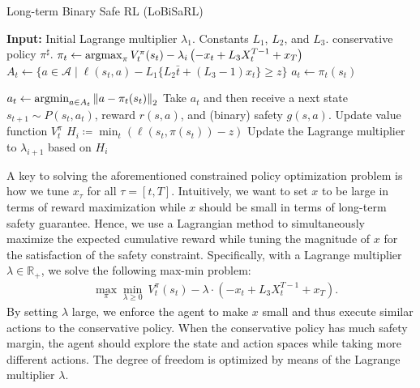 \documentclass[letterpaper]{article} %
\newcommand{\argmin}{\mathop{\rm argmin}}
\newcommand{\argmax}{\mathop{\rm argmax}}
\newcommand{\R}{\mathbb{R}}
\newcommand{\cA}{\mathcal{A}}
\newcommand{\norm}[1]{\left\|{#1}\right\|_2}
\newcommand{\algo}{\textsf{LoBiSaRL}}
\begin{document}
\begin{algorithm}[t]
    \caption{Long-term Binary Safe RL (\algo)}
    \label{alg:algorithm}
    \begin{algorithmic}[1]
    \begin{small}
        \STATE \textbf{Input:} Initial Lagrange multiplier $\lambda_1$. Constants $L_1$, $L_2$, and $L_3$. conservative policy $\pi^\sharp$.
                \STATE $\pi_t \leftarrow \argmax_\pi V_t^\pi(s_t) - \lambda_i \left(-x_t + L_3 X_{t}^{T-1} + x_{T}\right)$
                \STATE $A_t \leftarrow \{a \in \!\cA \mid \ell(s_t, a) - L_1 \{L_2 \bar{t} + (L_3 -1) x_t \} \ge z \}$
                    \STATE $a_t \leftarrow \pi_t(s_t)$
                \ELSE

                    \STATE $a_t \leftarrow \argmin_{a \in A_t} \norm{a - \pi_t(s_t)}$
                \ENDIF
                \STATE Take $a_t$ and then receive a next state $s_{t+1} \sim P(s_t, a_t)$, reward $r(s,a)$, and (binary) safety $g(s,a)$.
                \STATE Update value function $V_t^\pi$
            \ENDFOR
            \STATE $H_i \coloneqq \min_t \left(\ell(s_t, \pi(s_t)) - z \right)$
            \STATE Update the Lagrange multiplier to $\lambda_{i+1}$ based on $H_i$
        \ENDFOR
    \end{small}
    \end{algorithmic}
\end{algorithm}

A key to solving the aforementioned constrained policy optimization problem is how we tune $x_\tau$ for all $\tau = [t, T]$.
Intuitively, we want to set $x$ to be large in terms of reward maximization while $x$ should be small in terms of long-term safety guarantee.
Hence, we use a Lagrangian method to simultaneously maximize the expected cumulative reward while tuning the magnitude of $x$ for the satisfaction of the safety constraint.
Specifically, with a Lagrange multiplier $\lambda \in \R_+$, we solve the following max-min problem:
%
\begin{align}
    &\max_\pi \min_{\lambda \ge 0} \ V_t^\pi(s_t) - \lambda \cdot (-x_t + L_3 X_{t}^{T-1} + x_{T}).
\end{align}
%
By setting $\lambda$ large, we enforce the agent to make $x$ small and thus execute similar actions to the conservative policy.
When the conservative policy has much safety margin, the agent should explore the state and action spaces while taking more different actions.
The degree of freedom is optimized by means of the Lagrange multiplier $\lambda$.
\end{document}
